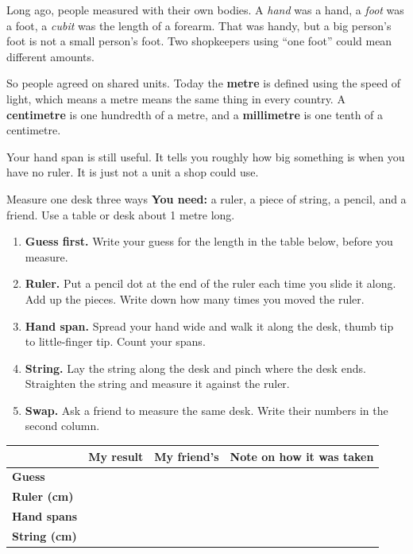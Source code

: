 Long ago, people measured with their own bodies. A \emph{hand} was a hand, a \emph{foot} was a foot, a \emph{cubit} was the length of a forearm. That was handy, but a big person's foot is not a small person's foot. Two shopkeepers using ``one foot'' could mean different amounts.

So people agreed on shared units. Today the \textbf{metre} is defined using the speed of light, which means a metre means the same thing in every country. A \textbf{centimetre} is one hundredth of a metre, and a \textbf{millimetre} is one tenth of a centimetre.

Your hand span is still useful. It tells you roughly how big something is when you have no ruler. It is just not a unit a shop could use.

\begin{tryit}{Measure one desk three ways}
\textbf{You need:} a ruler, a piece of string, a pencil, and a friend. Use a table or desk about 1 metre long.
\begin{enumerate}[leftmargin=1.6em]
\item \textbf{Guess first.} Write your guess for the length in the table below, before you measure.
\item \textbf{Ruler.} Put a pencil dot at the end of the ruler each time you slide it along. Add up the pieces. Write down how many times you moved the ruler.
\item \textbf{Hand span.} Spread your hand wide and walk it along the desk, thumb tip to little-finger tip. Count your spans.
\item \textbf{String.} Lay the string along the desk and pinch where the desk ends. Straighten the string and measure it against the ruler.
\item \textbf{Swap.} Ask a friend to measure the same desk. Write their numbers in the second column.
\end{enumerate}
\par\medskip
\renewcommand{\arraystretch}{1.9}
\begin{tabularx}{\linewidth}{|>{\sffamily\bfseries\small}p{2.3cm}|X|X|X|}
\hline
 & \textbf{My result} & \textbf{My friend's} & \textbf{Note on how it was taken}\\ \hline
Guess & & & \\ \hline
Ruler (cm) & & & \\ \hline
Hand spans & & & \\ \hline
String (cm) & & & \\ \hline
\end{tabularx}
\end{tryit}

